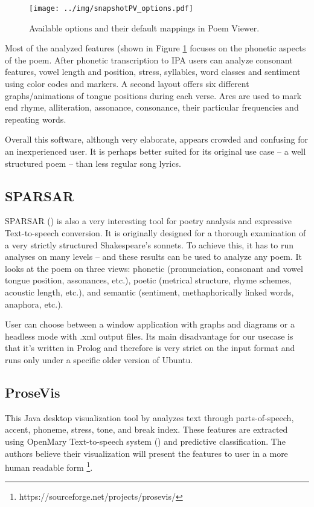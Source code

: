 \begin{figure}[h]\centering
	\texttt{[image: ../img/snapshotPV\_options.pdf]}
	\caption{Available options and their default mappings in Poem Viewer.}\label{screenshotPV-options}
\end{figure}

Most of the analyzed features (shown in Figure \ref{screenshotPV-options} focuses on the phonetic aspects of the poem. After phonetic transcription to IPA users can analyze consonant features, vowel length and position, stress, syllables, word classes and sentiment using color codes and markers. A second layout offers six different graphs/animations of tongue positions during each verse. Arcs are used to mark end rhyme, alliteration, assonance, consonance, their particular frequencies and repeating words.


Overall this software, although very elaborate, appears crowded and confusing for an inexperienced user. It is perhaps better suited for its original use case -- a well structured poem -- than less regular song lyrics.

\subsection{SPARSAR}
SPARSAR (\cite{Delmonte2014}) is also a very interesting tool for poetry analysis and expressive Text-to-speech conversion. It is originally designed for a thorough examination of a very strictly structured Shakespeare's sonnets. To achieve this, it has to run analyses on many levels -- and these results can be used to analyze any poem. It looks at the poem on three views: phonetic (pronunciation, consonant and vowel tongue position, assonances, etc.), poetic (metrical structure, rhyme schemes, acoustic length, etc.), and semantic (sentiment, methaphorically linked words, anaphora, etc.).

User can choose between a window application with graphs and diagrams or a headless mode with .xml output files. Its main disadvantage for our usecase is that it's written in Prolog and therefore is very strict on the input format and runs only under a specific older version of Ubuntu. 

\subsection{ProseVis}
This Java desktop visualization tool by \cite{Clement2013} analyzes text through
parts-of-speech, accent, phoneme, stress, tone, and break index. These features are extracted using OpenMary Text-to-speech system (\cite{Schroder2006}) and predictive classification. The authors believe their visualization will present the features to user in a more human readable form \footnote{https://sourceforge.net/projects/prosevis/}.

